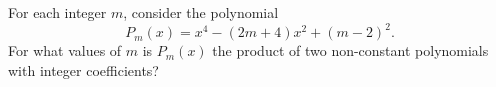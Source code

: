 For each integer $m$, consider the polynomial
\[P_m(x)=x^4-(2m+4)x^2+(m-2)^2.\] For what values of $m$ is $P_m(x)$
the product of two non-constant polynomials with integer coefficients?
